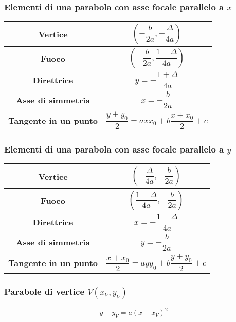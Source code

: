 \subsubsection{Elementi di una parabola con asse focale parallelo a $x$}
\begin{center}
	\begin{tabular}{c | c}
		\textbf{Vertice} & $\left(-\dfrac{b}{2a}, -\dfrac{\Delta}{4a}\right)$\\\hline
		\textbf{Fuoco} & $\left(-\dfrac{b}{2a},\dfrac{1-\Delta}{4a}\right)$\\\hline
		\textbf{Direttrice} & $y=-\dfrac{1+\Delta}{4a}$\\\hline
		\textbf{Asse di simmetria} & $x=-\dfrac{b}{2a}$\\\hline
		\textbf{Tangente in un punto} & $\dfrac{y+y_0}{2}=axx_0+b\dfrac{x+x_0}{2}+c$
	\end{tabular}
\end{center}

\subsubsection{Elementi di una parabola con asse focale parallelo a $y$}
\begin{center}
	\begin{tabular}{c | c}
		\textbf{Vertice} & $\left(-\dfrac{\Delta}{4a},-\dfrac{b}{2a}\right)$\\\hline
		\textbf{Fuoco} & $\left(\dfrac{1-\Delta}{4a},-\dfrac{b}{2a}\right)$\\\hline
		\textbf{Direttrice} & $x=-\dfrac{1+\Delta}{4a}$\\\hline
		\textbf{Asse di simmetria} & $y=-\dfrac{b}{2a}$\\\hline
		\textbf{Tangente in un punto} & $\dfrac{x+x_0}{2}=ayy_0+b\dfrac{y+y	_0}{2}+c$
	\end{tabular}
\end{center}

\subsubsection{Parabole di vertice $V(x_V,y_V)$}
\begin{equation*}
y-y_V=a(x-x_V)^2
\end{equation*}

